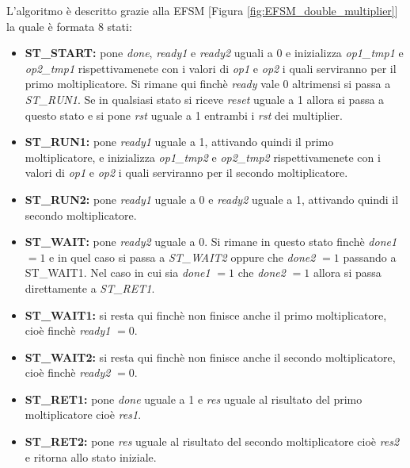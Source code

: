 \documentclass[]{IEEEtran}
\begin{document}
L'algoritmo è descritto grazie alla EFSM [Figura \ref{fig:EFSM_double_multiplier}] la quale è formata 8 stati:
\begin{itemize}
    \item \textbf{ST\_START:} pone \textit{done}, \textit{ready1} e \textit{ready2} uguali a 0 e inizializza \textit{op1\_tmp1} e \textit{op2\_tmp1} rispettivamenete con i valori di \textit{op1} e \textit{op2} i quali serviranno per il primo moltiplicatore. Si rimane qui finchè \textit{ready} vale 0 altrimensi si passa a \textit{ST\_RUN1}. Se in qualsiasi stato si riceve \textit{reset} uguale a 1 allora si passa a questo stato e si pone \textit{rst} uguale a 1 entrambi i \textit{rst} dei multiplier.
    \item \textbf{ST\_RUN1:} pone \textit{ready1} uguale a 1, attivando quindi il primo moltiplicatore, e inizializza \textit{op1\_tmp2} e \textit{op2\_tmp2} rispettivamenete con i valori di \textit{op1} e \textit{op2} i quali serviranno per il secondo moltiplicatore.
    \item \textbf{ST\_RUN2:} pone \textit{ready1} uguale a 0 e \textit{ready2} uguale a 1, attivando quindi il secondo moltiplicatore.
    \item \textbf{ST\_WAIT:} pone \textit{ready2} uguale a 0. Si rimane in questo stato finchè \textit{done1} $=1$ e in quel caso si passa a \textit{ST\_WAIT2} oppure che \textit{done2} $=1$ passando a {ST\_WAIT1}. Nel caso in cui sia \textit{done1} $=1$ che \textit{done2} $=1$ allora si passa direttamente a \textit{ST\_RET1}.
    \item \textbf{ST\_WAIT1:} si resta qui finchè non finisce anche il primo moltiplicatore, cioè finchè \textit{ready1} $=0$.
    \item \textbf{ST\_WAIT2:} si resta qui finchè non finisce anche il secondo moltiplicatore, cioè finchè \textit{ready2} $=0$.
    \item \textbf{ST\_RET1:} pone \textit{done} uguale a 1 e \textit{res} uguale al risultato del primo moltiplicatore cioè \textit{res1}.
    \item \textbf{ST\_RET2:} pone \textit{res} uguale al risultato del secondo moltiplicatore cioè \textit{res2} e ritorna allo stato iniziale.
\end{itemize}
\end{document}
